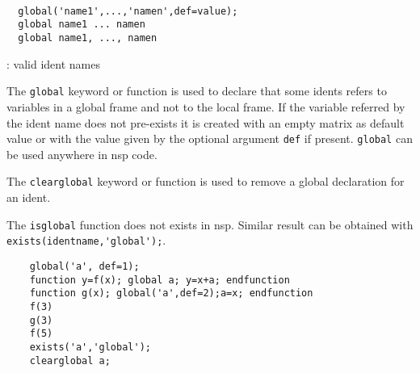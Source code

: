 \begin{mandesc}
   \\ %
   \\ %
   \\ %
\end{mandesc}
\begin{calling_sequence}
\begin{verbatim}
  global('name1',...,'namen',def=value);
  global name1 ... namen
  global name1, ..., namen
\end{verbatim}
\end{calling_sequence}
\begin{parameters}
  \begin{varlist}
    : valid ident names
  \end{varlist}
\end{parameters}
\begin{mandescription}
  The \verb!global! keyword or function is used to declare that some idents 
  refers to variables in a global frame and not to the local frame.
  If the variable referred by the ident name does not pre-exists 
  it is created with an empty matrix as default value or with the value 
  given by the optional argument \verb!def! if present. 
  \verb!global! can be used anywhere in nsp code.

  The \verb!clearglobal! keyword or function is used to remove a global 
  declaration for an ident.

  The \verb!isglobal! function does not exists in nsp. Similar result 
  can be obtained with \verb!exists(identname,'global');!.
  
\end{mandescription}
\begin{examples}
  \begin{Verbatim}
    global('a', def=1); 
    function y=f(x); global a; y=x+a; endfunction
    function g(x); global('a',def=2);a=x; endfunction
    f(3)
    g(3)
    f(5)
    exists('a','global');
    clearglobal a;
  \end{Verbatim}
\end{examples}
\begin{manseealso}
     
\end{manseealso}
